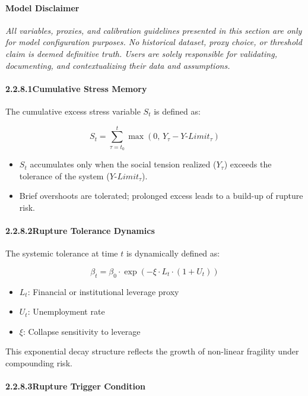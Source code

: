 \documentclass[12pt]{report}
\begin{document}
\paragraph{Model Disclaimer}
\textit{All variables, proxies, and calibration guidelines presented in this section are only for model configuration purposes. No historical dataset, proxy choice, or threshold claim is deemed definitive truth. Users are solely responsible for validating, documenting, and contextualizing their data and assumptions.}

\paragraph{2.2.8.1\quad Cumulative Stress Memory}

The cumulative excess stress variable $S_t$ is defined as:

\[
S_t = \sum_{\tau = t_0}^{t} \max(0,\, Y_\tau - Y\text{-}Limit_\tau)
\]

\begin{itemize}
  \item $S_t$ accumulates only when the social tension realized ($Y_\tau$) exceeds the tolerance of the system ($Y\text{-}Limit_\tau$).
  \item Brief overshoots are tolerated; prolonged excess leads to a build-up of rupture risk.
\end{itemize}

\paragraph{2.2.8.2\quad Rupture Tolerance Dynamics}

The systemic tolerance at time $t$ is dynamically defined as:

\[
\beta_t = \beta_0 \cdot \exp\left(-\xi \cdot L_t \cdot (1 + U_t)\right)
\]

\begin{itemize}
  \item $L_t$: Financial or institutional leverage proxy
  \item $U_t$: Unemployment rate
  \item $\xi$: Collapse sensitivity to leverage
\end{itemize}

This exponential decay structure reflects the growth of non-linear fragility under compounding risk.

\paragraph{2.2.8.3\quad Rupture Trigger Condition}
\end{document}
